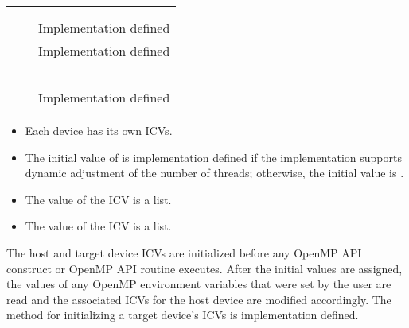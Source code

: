 \begin{supertabular}{p{1.4in} p{1.8in} p{1.5in}}
{}            & {}      & {}         \\
{}  & {}  & {}         \\
{}   & {}   & Implementation defined \\
{}    & {}    & Implementation defined \\
{}    & {}    & {}      \\
{} & {} & {}          \\
{}              & {}              & {}       \\
{}    & {}    & {}  \\
{}             & {}             & {}      \\
{}     & {}         & Implementation defined \\
\end{supertabular}

\linenumbers

\descr

\begin{itemize}
\item Each device has its own ICVs.
\item The initial value of  is implementation defined if the 
      implementation supports dynamic adjustment of the number of threads; 
      otherwise, the initial value is .
\item The value of the  ICV is a list.
\item The value of the  ICV is a list.
\end{itemize}

The host and target device ICVs are initialized before any OpenMP API construct or
OpenMP API routine executes. After the initial values are assigned, the values of any
OpenMP environment variables that were set by the user are read and the associated
ICVs for the host device are modified accordingly. The method for initializing a target
device's ICVs is implementation defined.

